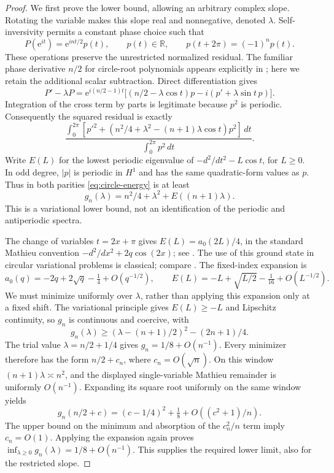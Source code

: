 \documentclass[11pt]{article}
\theoremstyle{remark}\newtheorem{remark}[theorem]{Remark}
\newcommand{\ee}{\mathrm e}
\begin{document}
\begin{proof}
We first prove the lower bound, allowing an arbitrary complex slope.
Rotating the variable makes this slope real and nonnegative, denoted
\(\lambda\). Self-inversivity permits a constant phase choice such that
\[
 P(\ee^{it})=\ee^{int/2}p(t),\qquad p(t)\in\mathbb R,
 \qquad p(t+2\pi)=(-1)^n p(t).
\]
These operations preserve the unrestricted normalized residual.
The familiar phase derivative \(n/2\) for circle-root polynomials
appears explicitly in \cite[(1.3)--(1.4)]{erdelyi}; here we retain
the additional scalar subtraction. Direct differentiation gives
\[
 P'-\lambda P=\ee^{i(n/2-1)t}
 \bigl[(n/2-\lambda\cos t)p-i(p'+\lambda\sin t\,p)\bigr].
\]
Integration of the cross term by parts is legitimate because
\(p^2\) is periodic. Consequently the squared residual is exactly
\begin{equation}\label{eq:circle-energy}
 \frac{\int_0^{2\pi}\!
 [p'^2+(n^2/4+\lambda^2-(n+1)\lambda\cos t)p^2]\,dt}
 {\int_0^{2\pi}p^2\,dt}.
\end{equation}
Write \(E(L)\) for the lowest periodic eigenvalue of
\(-d^2/dt^2-L\cos t\), for \(L\ge0\). In odd degree, \(|p|\)
is periodic in \(H^1\) and has the same quadratic-form values as
\(p\). Thus in both parities \eqref{eq:circle-energy} is at least
\[
 g_n(\lambda)=n^2/4+\lambda^2+E((n+1)\lambda).
\]
This is a variational lower bound, not an identification of the
periodic and antiperiodic spectra.

The change of variables \(t=2x+\pi\) gives
\(E(L)=a_0(2L)/4\), in the standard Mathieu convention
\(-d^2/dx^2+2q\cos(2x)\); see \cite[\S28.2]{dlmf}.
The use of this ground state in circular variational problems is
classical; compare \cite[\S VI.A.2]{busch}. The fixed-index expansion
\cite[(28.8.1), \(m=0,s=1\)]{dlmf} is
\[
 a_0(q)=-2q+2\sqrt q-\tfrac14+O(q^{-1/2}),
 \qquad
 E(L)=-L+\sqrt{L/2}-\tfrac1{16}+O(L^{-1/2}).
\]
We must minimize uniformly over \(\lambda\), rather than applying
this expansion only at a fixed shift. The variational principle
gives \(E(L)\ge-L\) and Lipschitz continuity, so \(g_n\) is
continuous and coercive, with
\[
 g_n(\lambda)\ge
 (\lambda-(n+1)/2)^2-(2n+1)/4.
\]
The trial value \(\lambda=n/2+1/4\) gives
\(g_n=1/8+O(n^{-1})\). Every minimizer therefore has the form
\(n/2+c_n\), where \(c_n=O(\sqrt n)\). On this window
\((n+1)\lambda\asymp n^2\), and the displayed single-variable
Mathieu remainder is uniformly \(O(n^{-1})\). Expanding its square
root uniformly on the same window yields
\[
 g_n(n/2+c)=(c-1/4)^2+\tfrac18+O((c^2+1)/n).
\]
The upper bound on the minimum and absorption of the \(c_n^2/n\)
term imply \(c_n=O(1)\). Applying the expansion again proves
\(\inf_{\lambda\ge0}g_n(\lambda)=1/8+O(n^{-1})\).
This supplies the required lower limit, also for the restricted slope.


\end{proof}
\end{document}

